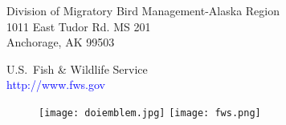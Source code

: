 \documentclass[
]{article}
\begin{document}
\clearpage%
\thispagestyle{empty}
\noindent Division of Migratory Bird Management-Alaska Region\\
1011 East Tudor Rd. MS 201\\
Anchorage, AK 99503\\
\vspace{0.25in}

\noindent U.S.~Fish \& Wildlife Service\\
\textcolor{blue}{http://www.fws.gov}\\
\vspace{0.25in}

\begin{figure}
	\begin{flushleft}
		\texttt{[image: doiemblem.jpg]}
		\texttt{[image: fws.png]}
	\end{flushleft}
\end{figure}
\vspace{0.25in}
\end{document}
